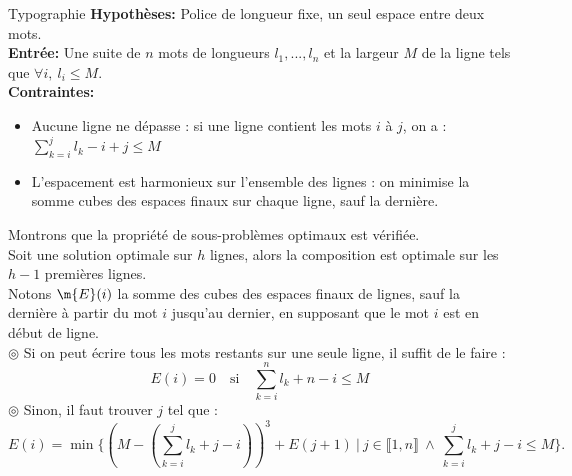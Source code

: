 \documentclass[french, 11pt]{article}
\begin{document}
\begin{ex}{Typographie}{}
    \textbf{Hypothèses:} Police de longueur fixe, un seul espace entre deux mots.\\
    \textbf{Entrée:} Une suite de $n$ mots de longueurs $l_1,...,l_n$ et la largeur $M$ de la ligne tels que $\forall i, ~ l_i \leq M$.\\
    \textbf{Contraintes:}
    \begin{itemize}[topsep=0pt,itemsep=-0.9 ex]
        \item Aucune ligne ne dépasse : si une ligne contient les mots $i$ à $j$, on a : $\sum_{k=i}^jl_k - i + j \leq M$
        \item L'espacement est harmonieux sur l'ensemble des lignes : on minimise la somme cubes des espaces finaux sur chaque ligne, sauf la dernière.
    \end{itemize}\vspace{0.2cm}
    Montrons que la propriété de sous-problèmes optimaux est vérifiée.\\
    Soit une solution optimale sur $h$ lignes, alors la composition est optimale sur les $h-1$ premières lignes.\\
    Notons $\m{E}(i)$ la somme des cubes des espaces finaux de lignes, sauf la dernière à partir du mot $i$ jusqu'au dernier, en supposant que le mot $i$ est en début de ligne.\\
    $\circledcirc$ Si on peut écrire tous les mots restants sur une seule ligne, il suffit de le faire : 
    \begin{equation*}
        E(i) = 0 \quad \text{si} \quad \sum_{k=i}^nl_k + n-i \leq M
    \end{equation*}
    $\circledcirc$ Sinon, il faut trouver $j$ tel que :
    \begin{equation*}
        E(i)=\min\{(M-(\sum_{k=i}^jl_k+j-i))^3+E(j+1) ~ | ~ j \in \llbracket1,n\rrbracket ~ \land ~ \sum_{k=i}^jl_k+j-i\leq M\}.
    \end{equation*}
\end{ex}
\end{document}
